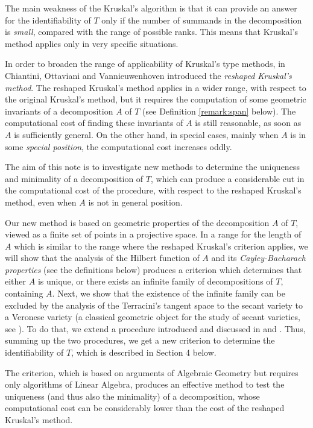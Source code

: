 \documentclass[a4paper,10pt,oneside]{article}
\theoremstyle{casep}
\theoremstyle{definition}
\begin{document}
The main weakness of the Kruskal's algorithm is that it can provide an answer for the identifiability of $T$ only if the number of summands in the decomposition is \emph{small}, compared with the range of possible ranks. This means that Kruskal's method applies only in very specific situations.

In order to broaden the range of applicability of Kruskal's type methods, in \cite{sette} Chiantini, Ottaviani and Vannieuwenhoven introduced the \emph{reshaped Kruskal's method}. The reshaped Kruskal's method
applies in a wider range, with respect to the original Kruskal's method, but it requires the computation of some geometric invariants of a decomposition $A$ of $T$ (see Definition \ref{remark:span} below).
The computational cost of finding these invariants of $A$ is still reasonable, as soon as $A$ is sufficiently general. On the other hand,
in special cases, mainly when $A$ is in some \emph{special position}, the computational cost increases oddly.

The aim of this note is to investigate new methods to determine the uniqueness and minimality of a decomposition of $T$,
 which can produce a considerable cut in the computational cost of the procedure, with respect to the reshaped Kruskal's method, 
 even when $A$ is not in general position.

Our new method is based on geometric properties of the decomposition $A$ of $T$, viewed as a finite set of points in a projective space.
In a range for the length of $A$ which is similar to the range where the reshaped Kruskal's criterion applies,
we will show that the analysis of the Hilbert function of $A$ and its \emph{Cayley-Bacharach properties} (see the definitions below) produces
a criterion which determines that either $A$ is unique, or there exists an infinite family of
decompositions of $T$, containing $A$. Next, we show that the existence of the infinite family can be excluded by the analysis
of the Terracini's tangent space to the secant variety to a Veronese variety (a classical geometric object for the study of secant varieties, see \cite{diciannove}). 
To do that, we extend a procedure introduced and discussed in \cite{sette} and \cite{otto}.
Thus, summing up the two procedures, we get a new criterion to determine the identifiability of $T$, which is described in Section 4 below.

The criterion, which is based on arguments of Algebraic Geometry but requires only algorithms of Linear Algebra, 
produces an effective method to test the uniqueness (and thus also the minimality) of a decomposition, whose computational cost can be considerably lower than the cost of the reshaped Kruskal's method.
\end{document}
